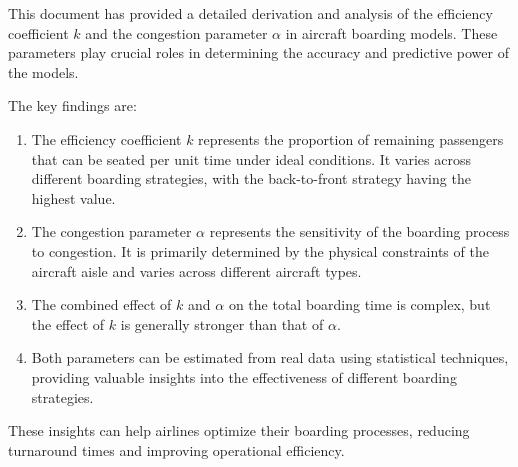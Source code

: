 \documentclass[12pt,a4paper]{article}
\begin{document}
This document has provided a detailed derivation and analysis of the efficiency coefficient $k$ and the congestion parameter $\alpha$ in aircraft boarding models. These parameters play crucial roles in determining the accuracy and predictive power of the models.

The key findings are:

\begin{enumerate}
    \item The efficiency coefficient $k$ represents the proportion of remaining passengers that can be seated per unit time under ideal conditions. It varies across different boarding strategies, with the back-to-front strategy having the highest value.
    
    \item The congestion parameter $\alpha$ represents the sensitivity of the boarding process to congestion. It is primarily determined by the physical constraints of the aircraft aisle and varies across different aircraft types.
    
    \item The combined effect of $k$ and $\alpha$ on the total boarding time is complex, but the effect of $k$ is generally stronger than that of $\alpha$.
    
    \item Both parameters can be estimated from real data using statistical techniques, providing valuable insights into the effectiveness of different boarding strategies.
\end{enumerate}

These insights can help airlines optimize their boarding processes, reducing turnaround times and improving operational efficiency.
\end{document}
